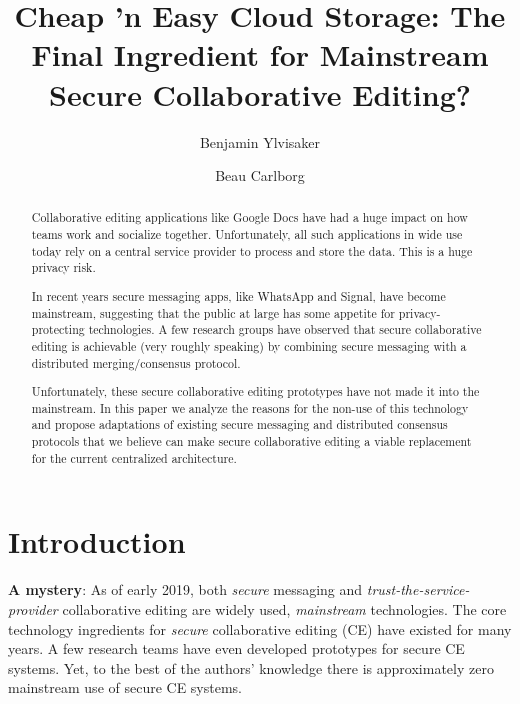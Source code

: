 \documentclass[runningheads]{llncs}
\begin{document}
\title{Cheap 'n Easy Cloud Storage: The Final Ingredient for Mainstream Secure Collaborative Editing?}

\author{Benjamin Ylvisaker \and
Beau Carlborg}


\maketitle

\begin{abstract}

Collaborative editing applications like Google Docs have had a huge impact on how teams work and socialize together.
Unfortunately, all such applications in wide use today rely on a central service provider to process and store the data.
This is a huge privacy risk.

In recent years secure messaging apps, like WhatsApp and Signal, have become mainstream, suggesting that the public at large has some appetite for privacy-protecting technologies.
A few research groups have observed that secure collaborative editing is achievable (very roughly speaking) by combining secure messaging with a distributed merging{\slash}consensus protocol.

Unfortunately, these secure collaborative editing prototypes have not made it into the mainstream.
In this paper we analyze the reasons for the non-use of this technology and propose adaptations of existing secure messaging and distributed consensus protocols that we believe can make secure collaborative editing a viable replacement for the current centralized architecture.

\end{abstract}

\section{Introduction}

\textbf{A mystery}:
As of early 2019, both \emph{secure} messaging and \emph{trust-the-service-provider} collaborative editing are widely used, \emph{mainstream} technologies.
The core technology ingredients for \emph{secure} collaborative editing (CE) have existed for many years.
A few research teams have even developed prototypes for secure CE systems.
Yet, to the best of the authors' knowledge there is approximately zero mainstream use of secure CE systems.
\end{document}
